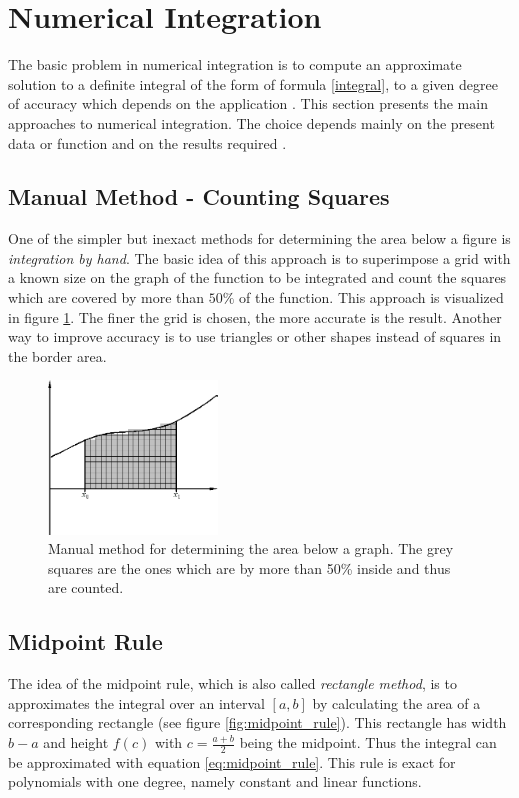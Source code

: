 
\section{Numerical Integration} \label{background}
The basic problem in numerical integration is to compute an approximate solution to a definite integral of the form of formula \ref{integral}, to a given degree of accuracy which depends on the application \cite{Wiki_Integration}. This section presents the main approaches to numerical integration. The choice depends mainly on the present data or function and on the results required \cite{Dalziel1998, Espelid}.



\subsection{Manual Method - Counting Squares}
One of the simpler but inexact methods for determining the area below a figure is \emph{integration by hand}. The basic idea of this approach is to superimpose a grid with a known size on the graph of the function to be integrated and count the squares which are covered by more than $50\%$ of the function. This approach is visualized in figure \ref{fig:manual_integration}. The finer the grid is chosen, the more accurate is the result. Another way to improve accuracy is to use triangles or other shapes instead of squares in the border area. \cite{Dalziel1998}

\begin{figure}[htbp]
	\centering
		\includegraphics[width=0.4\textwidth]{graphics/manual}
	\caption{Manual method for determining the area below a graph. The grey squares are the ones which are by more than 50\% inside and thus are counted.}
	\label{fig:manual_integration}
\end{figure}


\subsection{Midpoint Rule}
The idea of the midpoint rule, which is also called \emph{rectangle method}, is to approximates the integral over an interval $[a, b]$ by calculating the area of a corresponding rectangle (see figure \ref{fig:midpoint_rule}). This rectangle has width $b-a$ and height $f(c)$ with $c=\frac{a+b}{2}$ being the midpoint. Thus the integral can be approximated with equation \ref{eq:midpoint_rule}. This rule is exact for polynomials with one degree, namely constant and linear functions. \cite{Wiki_Rectangle}

